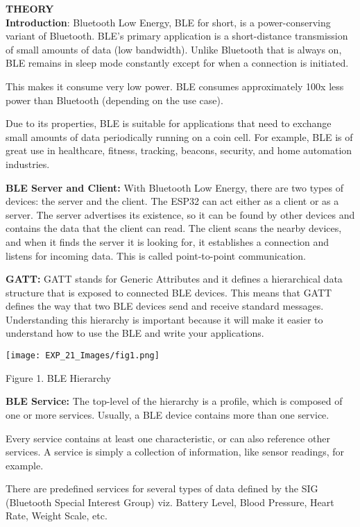 \documentclass[12pt,a4paper]{article}
\begin{document}
\begin{sloppypar}
\begin{justify}
\textbf{\large THEORY}\\[3pt]
\textbf{Introduction}: Bluetooth Low Energy, BLE for short, is a power-conserving variant of Bluetooth. BLE's primary application is a short-distance transmission of small amounts of data (low bandwidth). Unlike Bluetooth that is always on, BLE remains in sleep mode constantly except for when a connection is initiated.\par
\noindent This makes it consume very low power. BLE consumes approximately 100x less power than Bluetooth (depending on the use case).\par
\noindent Due to its properties, BLE is suitable for applications that need to exchange small amounts of data periodically running on a coin cell. For example, BLE is of great use in healthcare, fitness, tracking, beacons, security, and home automation industries.\par
\noindent \textbf{BLE Server and Client:} With Bluetooth Low Energy, there are two types of devices: the server and the client. The ESP32 can act either as a client or as a server.
The server advertises its existence, so it can be found by other devices and contains the data that the client can read. The client scans the nearby devices, and when it finds the server it is looking for, it establishes a connection and listens for incoming data. This is called point-to-point communication.\par
\noindent \textbf{GATT: }GATT stands for Generic Attributes and it defines a hierarchical data structure that is exposed to connected BLE devices. This means that GATT defines the way that two BLE devices send and receive standard messages. Understanding this hierarchy is important because it will make it easier to understand how to use the BLE and write your applications.

\begin{center} 
\texttt{[image: EXP\_21\_Images/fig1.png]}
\end{center}
\begin{center} {Figure 1. BLE Hierarchy}\end{center}

\noindent \textbf{BLE Service: }The top-level of the hierarchy is a profile, which is composed of one or more services. Usually, a BLE device contains more than one service.\par
\noindent Every service contains at least one characteristic, or can also reference other services. A service is simply a collection of information, like sensor readings, for example.\par
\noindent There are predefined services for several types of data defined by the SIG (Bluetooth Special Interest Group) viz. Battery Level, Blood Pressure, Heart Rate, Weight Scale, etc.


\end{justify}
\end{sloppypar}
\end{document}
